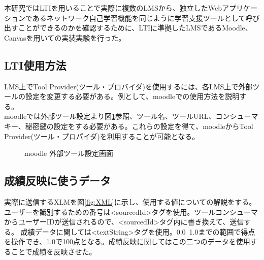 \label{tag:experiment}
本研究ではLTIを用いることで実際に複数のLMSから、独立したWebアプリケーションであるネットワーク自己学習機能を同じように学習支援ツールとして呼び出すことができるのかを確認するために、LTIに準拠したLMSであるMoodle、Canvasを用いての実装実験を行った。\\

\subsection{LTI使用方法}
LMS上でTool Provider(ツール・プロバイダ)を使用するには、各LMS上で外部ツールの設定を変更する必要がある。例として、moodleでの使用方法を説明する。\\
moodleでは外部ツール設定より図\ref{fig:moodle config}参照、ツール名、ツールURL、コンシューマキー、秘密鍵の設定をする必要がある。これらの設定を得て、moodleからTool Provider(ツール・プロパイダ)を利用することが可能となる。\\
\begin{figure}[htbp]
  \begin{center}
    \caption{moodle 外部ツール設定画面}
    \label{fig:moodle config}
  \end{center}
\end{figure}

\subsection{成績反映に使うデータ}
実際に送信するXLMを図\ref{fig:XML}に示し、使用する値についての解説をする。\\
ユーザーを識別するための番号は<sourcedId>タグを使用。ツールコンシューマからユーザーIDが送信されるので、<sourcedId>タグ内に書き換えて、送信する。
成績データに関しては<textString>タグを使用。0.0~1.0までの範囲で得点を操作でき、1.0で100点となる。成績反映に関してはこの二つのデータを使用することで成績を反映させた。

